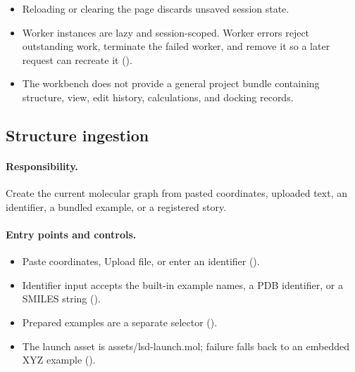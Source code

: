 \documentclass[11pt]{article}
\begin{document}
\begin{small}
\begin{itemize}[leftmargin=*]

\item Reloading or clearing the page discards unsaved session state.

\item Worker instances are lazy and session-scoped. Worker errors reject outstanding work, terminate the failed worker, and remove it so a later request can recreate it ().

\item The workbench does not provide a general project bundle containing structure, view, edit history, calculations, and docking records.

\end{itemize}

\subsection{Structure ingestion}\label{appB:sec4}

\paragraph{Responsibility.}

Create the current molecular graph from pasted coordinates, uploaded text, an identifier, a bundled example, or a registered story.

\paragraph{Entry points and controls.}

\begin{itemize}[leftmargin=*]

\item Paste coordinates, Upload file, or enter an identifier ().

\item Identifier input accepts the built-in example names, a PDB identifier, or a SMILES string ().

\item Prepared examples are a separate selector ().

\item The launch asset is assets/lsd-launch.mol; failure falls back to an embedded XYZ example ().

\end{itemize}


\end{small}
\end{document}
